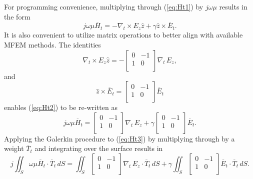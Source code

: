 \documentclass[titlepage]{article}
\renewcommand\_{\textunderscore\linebreak[1]}
\begin{document}
For programming convenience, multiplying through (\ref{eq:Ht1}) by $j\omega\mu$ results in the form
\begin{equation}
\label{eq:Ht2}
j\omega\mu\overline{H}_t=-\nabla_t\times E_z\hat{z}+\gamma\hat{z}\times\overline{E}_t.
\end{equation}
It is also convenient to utilize matrix operations to better align with available MFEM methods. The identities
\begin{equation}
\nabla_t\times E_z\hat{z}=-
\left[ \begin{array}{cc}
  0 & -1 \\
  1 & 0 \\
\end{array} \right] \nabla_t \, E_z,
\end{equation}
and
\begin{equation}
\hat{z}\times\overline{E}_t=\left[ \begin{array}{cc}
  0 & -1 \\
  1 & 0 \\
\end{array} \right] \overline{E}_t
\end{equation}
enables (\ref{eq:Ht2}) to be re-written as
\begin{equation}
\label{eq:Ht3}
j\omega\mu\overline{H}_t=\left[ \begin{array}{cc}
  0 & -1 \\
  1 & 0 \\
\end{array} \right] \nabla_t \, E_z+\gamma \left[ \begin{array}{cc}
  0 & -1 \\
  1 & 0 \\
\end{array} \right]\overline{E}_t.
\end{equation}
Applying the Galerkin procedure to (\ref{eq:Ht3}) by multiplying through by a weight $\overline{T}_t$ and integrating over the surface results in
\begin{equation}
j\iint_S \omega\mu\overline{H}_t \cdot \overline{T}_t \,dS = \iint_S \left[ \begin{array}{cc}
  0 & -1 \\
  1 & 0 \\
\end{array} \right] \nabla_t \, E_z\cdot \overline{T}_t \,dS + \gamma\iint_S \left[ \begin{array}{cc}
  0 & -1 \\
  1 & 0 \\
\end{array} \right]\overline{E}_t \cdot \overline{T}_t \,dS.
\end{equation}
\end{document}
